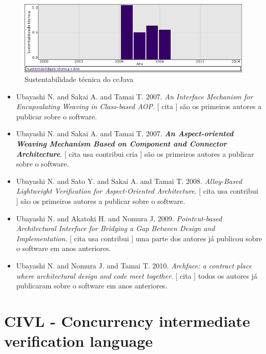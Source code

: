 \begin{figure}[h]
  \center
  \includegraphics[scale=0.50]{imagens/softwares-charts/ccjava.png}
  \caption{Sustentabilidade técnica do ccJava}
\end{figure}


\begin{itemize}
\item Ubayashi N. and Sakai A. and Tamai T.
      2007.
        \textit{ An Interface Mechanism for Encapsulating Weaving in Class-based AOP}.
      [
          cita
      ]
são os primeiros autores a publicar sobre o software.
\item Ubayashi N. and Sakai A. and Tamai T.
      2007.
        \textbf{\textit{ An Aspect-oriented Weaving Mechanism Based on Component and Connector Architecture}}.
      [
          cita
          usa
          contribui
          cria
      ]
são os primeiros autores a publicar sobre o software.
\item Ubayashi N. and Sato Y. and Sakai A. and Tamai T.
      2008.
        \textit{ Alloy-Based Lightweight Verification for Aspect-Oriented Architecture}.
      [
          cita
          usa
          contribui
      ]
são os primeiros autores a publicar sobre o software.
\item Ubayashi N. and Akatoki H. and Nomura J.
      2009.
        \textit{ Pointcut-based Architectural Interface for Bridging a Gap Between Design and Implementation}.
      [
          cita
          usa
          contribui
      ]
uma parte dos autores já publicou sobre o software em anos anteriores.
\item Ubayashi N. and Nomura J. and Tamai T.
      2010.
        \textit{ Archface: a contract place where architectural design and code meet together}.
      [
          cita
      ]
todos os autores já publicaram sobre o software em anos anteriores.
\end{itemize}
\section{CIVL - Concurrency intermediate verification language}

